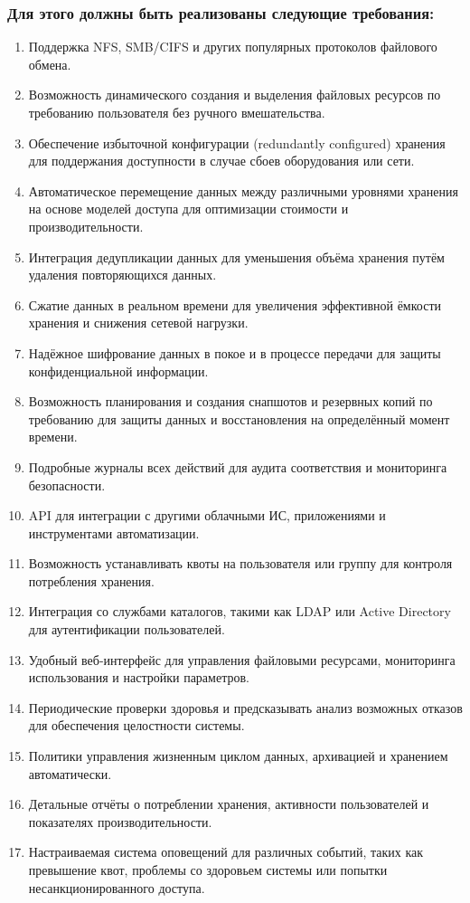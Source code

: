 \documentclass[14pt, a4paper]{extarticle}
\begin{document}
\subsubsection*{Для этого должны быть реализованы следующие требования:}

\begin{enumerate}
\item Поддержка NFS, SMB/CIFS и других популярных протоколов файлового обмена.
\item Возможность динамического создания и выделения файловых ресурсов по требованию пользователя без ручного вмешательства.
\item Обеспечение избыточной конфигурации (redundantly configured) хранения для поддержания доступности в случае сбоев оборудования или сети.
\item Автоматическое перемещение данных между различными уровнями хранения на основе моделей доступа для оптимизации стоимости и производительности.
\item Интеграция дедупликации данных для уменьшения объёма хранения путём удаления повторяющихся данных.
\item Сжатие данных в реальном времени для увеличения эффективной ёмкости хранения и снижения сетевой нагрузки.
\item Надёжное шифрование данных в покое и в процессе передачи для защиты конфиденциальной информации.
\item Возможность планирования и создания снапшотов и резервных копий по требованию для защиты данных и восстановления на определённый момент времени.
\item Подробные журналы всех действий для аудита соответствия и мониторинга безопасности.
\item API для интеграции с другими облачными ИС, приложениями и инструментами автоматизации.
\item Возможность устанавливать квоты на пользователя или группу для контроля потребления хранения.
\item Интеграция со службами каталогов, такими как LDAP или Active Directory для аутентификации пользователей.
\item Удобный веб-интерфейс для управления файловыми ресурсами, мониторинга использования и настройки параметров.
\item Периодические проверки здоровья и предсказывать анализ возможных отказов для обеспечения целостности системы.
\item Политики управления жизненным циклом данных, архивацией и хранением автоматически.
\item Детальные отчёты о потреблении хранения, активности пользователей и показателях производительности.
\item Настраиваемая система оповещений для различных событий, таких как превышение квот, проблемы со здоровьем системы или попытки несанкционированного доступа.
\end{enumerate}
\end{document}

